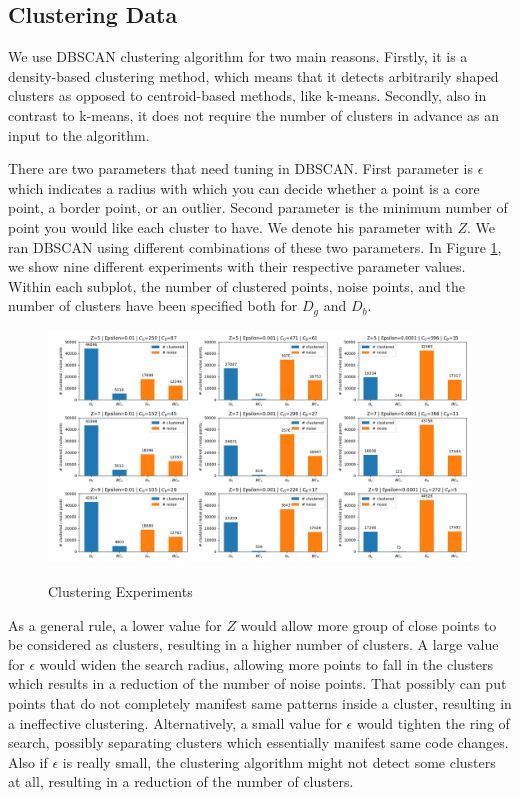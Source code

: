 \subsection{Clustering Data}

We use DBSCAN clustering algorithm for two main reasons. Firstly, it is a density-based clustering method, which means that it detects arbitrarily shaped clusters as opposed to centroid-based methods, like k-means. Secondly, also in contrast to k-means, it does not require the number of clusters in advance as an input to the algorithm.

There are two parameters that need tuning in DBSCAN. First parameter is $\epsilon$ which indicates a radius with which you can decide whether a point is a core point, a border point, or an outlier. Second parameter is the minimum number of point you would like each cluster to have. We denote his parameter with $Z$. We ran DBSCAN using different combinations of these two parameters. In Figure \ref{clustering}, we show nine different experiments with their respective parameter values. Within each subplot, the number of clustered points, noise points, and the number of clusters have been specified both for $D_g$ and $D_b$. 


\begin{figure}[h]
\centering
\includegraphics[width=1\textwidth]{clusters.png}
\label{clustering}
\caption{Clustering Experiments}
\end{figure}

As a general rule, a lower value for $Z$ would allow more group of close points to be considered as clusters, resulting in a higher number of clusters. A large value for $\epsilon$ would widen the search radius, allowing more points to fall in the clusters which results in a reduction of the number of noise points. That possibly can put points that do not completely manifest same patterns inside a cluster, resulting in a ineffective clustering. Alternatively, a small value for $\epsilon$ would tighten the ring of search, possibly separating clusters which essentially manifest same code changes. Also if $\epsilon$ is really small, the clustering algorithm might not detect some clusters at all, resulting in a reduction of the number of clusters. 

